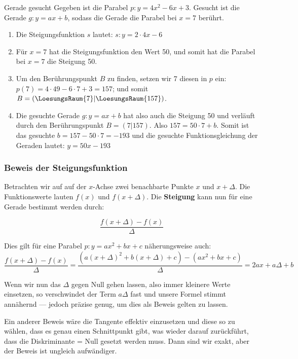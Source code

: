 \begin{beispiel}{Gerade gesucht}{}
Gegeben ist die Parabel $p: y=4x^2 -6x + 3$. Gesucht ist die Gerade
$g: y=ax+b$, sodass die Gerade die Parabel bei $x=7$ berührt.

\begin{enumerate}
\item Die Steigungsfunktion $s$ lautet: $s: y=2\cdot{}4x - 6$
\item Für $x=7$ hat die Steigungsfunktion den Wert 50, und somit hat
  die Parabel bei $x=7$ die Steigung 50.
\item Um den Berührungspunkt $B$ zu finden, setzen wir 7 diesen in $p$
  ein: $p(7)= 4\cdot{}49-6\cdot{}7+3 = 157$; und somit $B=(\LoesungsRaum{7}|\LoesungsRaum{157})$.
\item Die gesuchte Gerade $g: y=ax+b$ hat also auch die Steigung 50
  und verläuft durch den Berührungspunkt $B=(7|157)$. Also
  $157=50\cdot{}7+b$. Somit ist das gesuchte $b = 157-50\cdot{}7=-193$
  und die gesuchte Funktionsgleichung der Geraden lautet: $y = 50x-193$
  \end{enumerate}
\end{beispiel}
\newpage



\subsubsection{Beweis der Steigungsfunktion}

Betrachten wir auf auf der $x$-Achse zwei benachbarte Punkte $x$ und
$x+\Delta$. Die Funktionswerte lauten $f(x)$ und $f(x+\Delta)$. Die
\textbf{Steigung} kann nun für eine Gerade bestimmt werden durch:


$$\frac{f(x+\Delta) - f(x)}{\Delta}$$

Dies gilt für eine Parabel $p: y=ax^2+bx+c$ näherungsweise auch:
$$\frac{f(x+\Delta)-f(x)}{\Delta} = \frac{(a(x+\Delta)^2 + b(x+\Delta)
  + c) - (ax^2 + bx +c)}{\Delta}=2ax+a\Delta+b$$

Wenn wir nun das $\Delta$ gegen Null gehen lassen, also immer kleinere
Werte einsetzen, so verschwindet der Term $a\Delta$ fast und unsere
Formel stimmt annähernd --- jedoch präzise genug, um dies als Beweis
gelten zu lassen.

Ein anderer Beweis wäre die Tangente effektiv einzusetzen und diese so
zu wählen, dass es genau einen Schnittpunkt gibt, was wieder darauf
zurückführt, dass die Diskriminante = Null gesetzt werden muss. Dann
sind wir exakt, aber der Beweis ist ungleich aufwändiger.
\newpage

